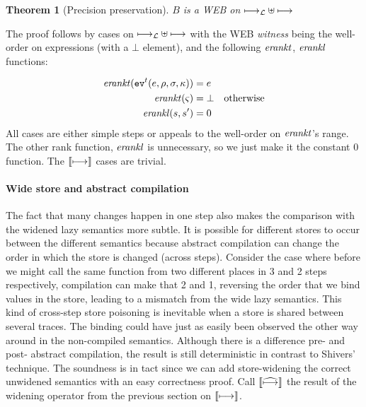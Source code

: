 \documentclass[preprint,onecolumn,9pt]{sigplanconf} %
\newtheorem{theorem}{Theorem}
\begin{document}
\begin{theorem}[Precision preservation]
$B$ is a WEB on $\lmachstep \uplus \machstep$
\end{theorem}

The proof follows by cases on $\lmachstep \uplus \machstep$ with the
WEB \emph{witness} being the well-order on expressions (with a $\bot$
element), and the following $\erankt$, $\erankl$ functions:

\begin{align*}
\erankt(\ev[^\mcntr]{\mexp,\menv,\msto,\mkont}) &= \mexp \\
\erankt(\mstate) &= \bot \quad \text{otherwise} \\
\erankl(s,s') &= 0
\end{align*}
All cases are either simple steps or appeals to the well-order on $\erankt$'s range. The other rank function,
$\erankl$ is unnecessary, so we just make it the constant 0
function. The $\cmachstep$ cases are trivial.

\paragraph{Wide store and abstract compilation}
The fact that many changes happen in one step also makes the
comparison with the widened lazy semantics more subtle. It is possible
for different stores to occur between the different semantics because
abstract compilation can change the order in which the store is
changed (across steps). Consider the case where before we might call
the same function from two different places in 3 and 2 steps
respectively, compilation can make that 2 and 1, reversing the order
that we bind values in the store, leading to a mismatch from the wide
lazy semantics.  This kind of cross-step store poisoning is inevitable
when a store is shared between several traces. The binding could have
just as easily been observed the other way around in the non-compiled
semantics. Although there is a difference pre- and post- abstract
compilation, the result is still deterministic in contrast to Shivers'
technique. The soundness is in tact since we can add store-widening
the correct unwidened semantics with an easy correctness proof. Call
$\camachstep$ the result of the widening operator from the previous
section on $\cmachstep$.


\end{document}
